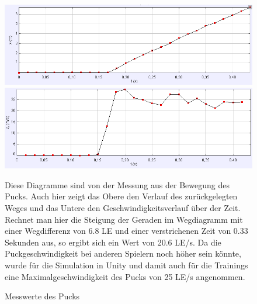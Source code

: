 \begin{figure}
\includegraphics[width=\textwidth]{images/messung_bolzen_x}
\includegraphics[width=\textwidth]{images/messung_bolzen_v}
 \caption{Messwerte des Pucks}
 \label{mess_puck}
Diese Diagramme sind von der Messung aus der Bewegung des Pucks. Auch hier zeigt das Obere den Verlauf des zurückgelegten Weges und das Untere den Geschwindigkeitsverlauf über der Zeit. Rechnet man hier die Steigung der Geraden im Wegdiagramm mit einer Wegdifferenz von 6.8 LE und einer verstrichenen Zeit von 0.33 Sekunden aus, so ergibt sich ein Wert von 20.6 LE/s. Da die Puckgeschwindigkeit bei anderen Spielern noch höher sein könnte, wurde für die Simulation in Unity und damit auch für die Trainings eine Maximalgeschwindigkeit des Pucks von 25 LE/s angenommen. 
\end{figure}

